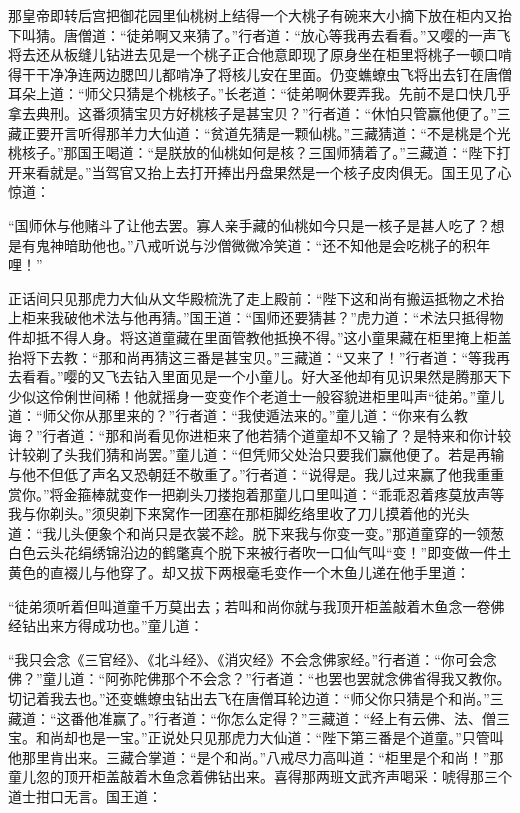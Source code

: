 \documentclass[12pt,UTF8]{ctexbook}
\begin{document}
{那皇帝即转后宫把御花园里仙桃树上结得一个大桃子有碗来大小摘下放在柜内又抬下叫猜。唐僧道：“徒弟啊又来猜了。”行者道：“放心等我再去看看。”又嘤的一声飞将去还从板缝儿钻进去见是一个桃子正合他意即现了原身坐在柜里将桃子一顿口啃得干干净净连两边腮凹儿都啃净了将核儿安在里面。仍变蟭蟟虫飞将出去钉在唐僧耳朵上道：“师父只猜是个桃核子。”长老道：“徒弟啊休要弄我。先前不是口快几乎拿去典刑。这番须猜宝贝方好桃核子是甚宝贝？”行者道：“休怕只管赢他便了。”三藏正要开言听得那羊力大仙道：“贫道先猜是一颗仙桃。”三藏猜道：“不是桃是个光桃核子。”那国王喝道：“是朕放的仙桃如何是核？三国师猜着了。”三藏道：“陛下打开来看就是。”当驾官又抬上去打开捧出丹盘果然是一个核子皮肉俱无。国王见了心惊道：

“国师休与他赌斗了让他去罢。寡人亲手藏的仙桃如今只是一核子是甚人吃了？想是有鬼神暗助他也。”八戒听说与沙僧微微冷笑道：“还不知他是会吃桃子的积年哩！”

正话间只见那虎力大仙从文华殿梳洗了走上殿前：“陛下这和尚有搬运抵物之术抬上柜来我破他术法与他再猜。”国王道：“国师还要猜甚？”虎力道：“术法只抵得物件却抵不得人身。将这道童藏在里面管教他抵换不得。”这小童果藏在柜里掩上柜盖抬将下去教：“那和尚再猜这三番是甚宝贝。”三藏道：“又来了！”行者道：“等我再去看看。”嘤的又飞去钻入里面见是一个小童儿。好大圣他却有见识果然是腾那天下少似这伶俐世间稀！他就摇身一变变作个老道士一般容貌进柜里叫声“徒弟。”童儿道：“师父你从那里来的？”行者道：“我使遁法来的。”童儿道：“你来有么教诲？”行者道：“那和尚看见你进柜来了他若猜个道童却不又输了？是特来和你计较计较剃了头我们猜和尚罢。”童儿道：“但凭师父处治只要我们赢他便了。若是再输与他不但低了声名又恐朝廷不敬重了。”行者道：“说得是。我儿过来赢了他我重重赏你。”将金箍棒就变作一把剃头刀搂抱着那童儿口里叫道：“乖乖忍着疼莫放声等我与你剃头。”须臾剃下来窝作一团塞在那柜脚纥络里收了刀儿摸着他的光头道：“我儿头便象个和尚只是衣裳不趁。脱下来我与你变一变。”那道童穿的一领葱白色云头花绢绣锦沿边的鹤氅真个脱下来被行者吹一口仙气叫“变！”即变做一件土黄色的直裰儿与他穿了。却又拔下两根毫毛变作一个木鱼儿递在他手里道：

“徒弟须听着但叫道童千万莫出去；若叫和尚你就与我顶开柜盖敲着木鱼念一卷佛经钻出来方得成功也。”童儿道：

“我只会念《三官经》、《北斗经》、《消灾经》不会念佛家经。”行者道：“你可会念佛？”童儿道：“阿弥陀佛那个不会念？”行者道：“也罢也罢就念佛省得我又教你。切记着我去也。”还变蟭蟟虫钻出去飞在唐僧耳轮边道：“师父你只猜是个和尚。”三藏道：“这番他准赢了。”行者道：“你怎么定得？”三藏道：“经上有云佛、法、僧三宝。和尚却也是一宝。”正说处只见那虎力大仙道：“陛下第三番是个道童。”只管叫他那里肯出来。三藏合掌道：“是个和尚。”八戒尽力高叫道：“柜里是个和尚！”那童儿忽的顶开柜盖敲着木鱼念着佛钻出来。喜得那两班文武齐声喝采：唬得那三个道士拑口无言。国王道：

}
\end{document}

